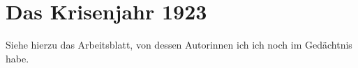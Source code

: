 \section{Das Krisenjahr 1923}
\label{sec:krisj-1923}

Siehe hierzu das Arbeitsblatt, von dessen Autorinnen ich  ich noch im Gedächtnis habe.

\endinput

